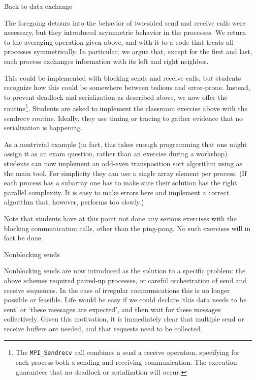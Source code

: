  {Back to data exchange}

The foregoing detours into the behavior of two-sided send and receive calls
were necessary, but they introduced asymmetric behavior in the processes.
We return to the averaging operation given above, and with it to a code
that treats all processes symmetrically.
In particular, we argue that, except for the first and last,
each process exchanges information with its left and right neighbor.

This could be implemented with blocking sends and receive calls, but
students recognize how this could be somewhere between tedious and
error-prone.  Instead, to prevent deadlock and serialization as
described above, we now offer the 
routine\footnote{The {\tt MPI\_Sendrecv} call combines a send a receive
  operation, specifying for each process both a sending and receiving
  communication. The execution guarantees that no deadlock or
  serialization will occur.}. Students are asked to implement the
classroom exercise above with the sendrecv routine.  Ideally, they use
timing or tracing to gather evidence that no serialization is
happening.

As a nontrivial example (in fact, this takes enough programming that
one might assign it as an exam question, rather than an exercise
during a workshop) students can now implement an odd-even
transposition sort
algorithm using  as the main tool.
For simplicity they can use a single array element per process.
(If each process has a subarray one has to make sure their solution
has the right parallel complexity. It is easy to make errors here
and implement a correct algorithm that, however, performs too slowly.)

Note that students have at this point not done any serious exercises
with the blocking communication calls, other than the ping-pong.
No such exercises will in fact be done.

 {Nonblocking sends}
\label{sec:mental-nonblock}

Nonblocking sends are now introduced as the solution to a specific problem:
the above schemes required paired-up processes, or careful orchestration
of send and receive sequences. In the case of irregular communications
%
%
this is no longer possible or feasible. Life would be easy if we could
declare `this data needs to be sent' or `these messages are expected',
and then wait for these messages collectively.
Given this motivation, it is immediately clear that multiple send or receive
buffers are needed, and that requests need to be collected.

